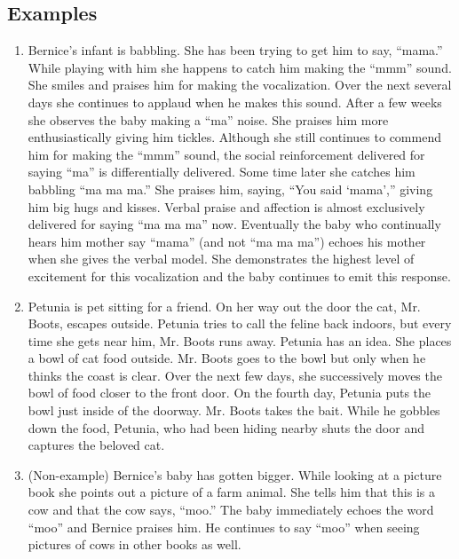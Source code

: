 \subsection{Examples}
\begin{enumerate}
\item Bernice's infant is babbling. She has been trying to get him to say, ``mama.'' While playing with him she happens to catch him making the ``mmm'' sound. She smiles and praises him for making the vocalization. Over the next several days she continues to applaud when he makes this sound.  After a few weeks she observes the baby making a ``ma'' noise.  She praises him more enthusiastically giving him tickles. Although she still continues to commend him for making the ``mmm'' sound, the social reinforcement delivered for saying ``ma'' is differentially delivered.  Some time later she catches him babbling ``ma ma ma.''  She praises him, saying, ``You said ‘mama','' giving him big hugs and kisses. Verbal praise and affection is almost exclusively delivered for saying ``ma ma ma'' now. Eventually the baby who continually hears him mother say ``mama'' (and not ``ma ma ma'') echoes his mother when she gives the verbal model.  She demonstrates the highest level of excitement for this vocalization and the baby continues to emit this response.  
\item Petunia is pet sitting for a friend.  On her way out the door the cat, Mr. Boots, escapes outside.  Petunia tries to call the feline back indoors, but every time she gets near him, Mr. Boots runs away.  Petunia has an idea.  She places a bowl of cat food outside.  Mr. Boots goes to the bowl but only when he thinks the coast is clear.  Over the next few days, she successively moves the bowl of food closer to the front door.  On the fourth day, Petunia puts the bowl just inside of the doorway.  Mr. Boots takes the bait.  While he gobbles down the food, Petunia, who had been hiding nearby shuts the door and captures the beloved cat.  
\item (Non-example) Bernice's baby has gotten bigger.  While looking at a picture book she points out a picture of a farm animal.  She tells him that this is a cow and that the cow says, ``moo.'' The baby immediately echoes the word ``moo'' and Bernice praises him.  He continues to say ``moo'' when seeing pictures of cows in other books as well.
\end{enumerate}
% 
